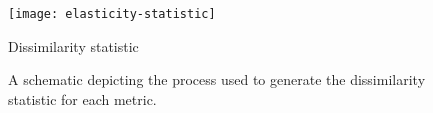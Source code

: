 \begin{figure}
\begin{center}

\texttt{[image: elasticity-statistic]}
\caption{
Dissimilarity statistic
}

\caption{
A schematic depicting the process used to generate the dissimilarity statistic for each metric.
}
\label{fig:dissimilarity_statistic}

\end{center}
\end{figure}
